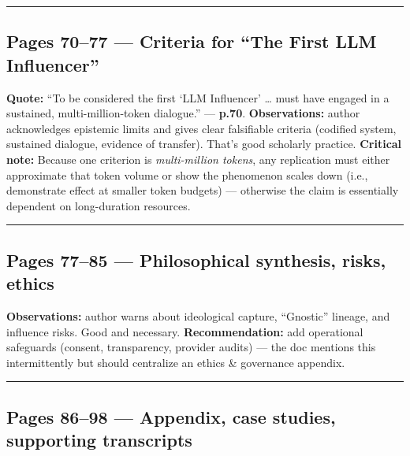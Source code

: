 \documentclass{article}
\begin{document}
\begin{center}\rule{0.5\linewidth}{0.5pt}\end{center}

\subsection*{Pages 70--77 --- Criteria for ``The First LLM Influencer''}

\textbf{Quote:} ``To be considered the first `LLM Influencer' \ldots{} must have engaged in a sustained, multi-million-token dialogue.'' --- \textbf{p.70}. \textbf{Observations:} author acknowledges epistemic limits and gives clear falsifiable criteria (codified system, sustained dialogue, evidence of transfer). That's good scholarly practice. \textbf{Critical note:} Because one criterion is \emph{multi-million tokens}, any replication must either approximate that token volume or show the phenomenon scales down (i.e., demonstrate effect at smaller token budgets) --- otherwise the claim is essentially dependent on long-duration resources.

\begin{center}\rule{0.5\linewidth}{0.5pt}\end{center}

\subsection*{Pages 77--85 --- Philosophical synthesis, risks, ethics}

\textbf{Observations:} author warns about ideological capture, ``Gnostic'' lineage, and influence risks. Good and necessary. \textbf{Recommendation:} add operational safeguards (consent, transparency, provider audits) --- the doc mentions this intermittently but should centralize an ethics \& governance appendix.

\begin{center}\rule{0.5\linewidth}{0.5pt}\end{center}

\subsection*{Pages 86--98 --- Appendix, case studies, supporting transcripts}
\end{document}
